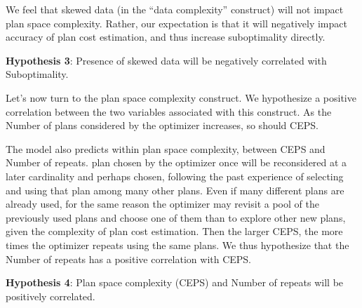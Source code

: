 \documentclass[prodmode,acmtods]{acmsmall}
\begin{document}
\vspace{0.6em}
We feel that skewed data (in the ``data complexity''
construct) will not impact plan space complexity. Rather, our expectation is
that it will negatively impact accuracy of plan cost estimation, and thus
increase suboptimality directly.

\vspace{0.6em}\noindent
{\bf Hypothesis 3}: Presence of skewed data will be negatively correlated with Suboptimality.

\vspace{0.6em}
Let's now turn to the plan space complexity construct. We hypothesize a positive
correlation between the two variables associated with this construct. As the
Number of plans considered by the optimizer increases, so should CEPS.

The model also predicts  within plan space
complexity, between 
CEPS and Number of repeats.  plan chosen by the optimizer once will be reconsidered at a
later cardinality and perhaps chosen, following
the past experience of selecting and using that plan among many other plans.
Even if many different plans are already used, 
for the same reason the optimizer may revisit a pool of 
the previously used plans and choose one of them than to explore other new plans, 
given the complexity of plan cost estimation. 
Then the larger CEPS, the more times the optimizer repeats using the same plans. 
We thus hypothesize that the Number of repeats has a positive correlation with CEPS. 

\vspace{0.6em}\noindent
{\bf Hypothesis 4}: Plan space complexity (CEPS) and Number of repeats will be positively correlated.
\end{document}

